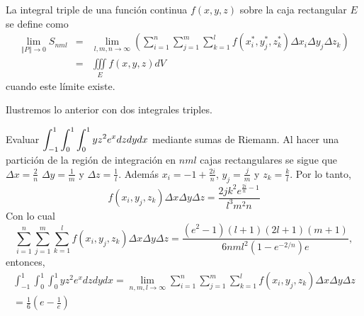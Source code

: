 \begin{defi}
La integral triple de una función continua $f(x,y,z)$
sobre la caja rectangular $E$ se define como
\begin{eqnarray}
\lim_{\left\Vert P\right\Vert \rightarrow 0}S_{nml} &=& \lim_{l,m,n \to\infty}\left(\sum_{i=1}^{n}\sum_{j=1}^{m}\sum_{k=1}^{l}f\left( x_{i}^{\ast },y_{j}^{\ast },z_{k}^{\ast}\right) \Delta x_{i}\Delta y_{j}\Delta z_{k} \right)\nonumber \\ &=&\iiint\limits_{E}f\left(x,y,z\right) dV
\end{eqnarray}
cuando este límite existe.
\end{defi}
Ilustremos lo anterior con dos integrales triples.
\begin{ejemplo}
Evaluar {\small $\displaystyle \int_{-1}^1\int_0^1\int_0^1  yz^2 e^{x} dzdydx$} mediante sumas de Riemann.
Al hacer una partición de la región de integración en $nml$ cajas rectangulares se sigue que
$\Delta x= \frac{2}{n}$ $\Delta y= \frac{1}{m}$ y $\Delta z= \frac{1}{l}$. Además
$x_i= -1+\frac{2i}{n}$, $y_j=\frac{j}{m}$ y $z_k=\frac{k}{l}$.
Por lo tanto,
$$f(x_i,y_j,z_k)\Delta x \Delta y\Delta z=\frac{2 j k^2 e^{\frac{2 i}{n}-1}}{l^3 m^2 n}$$
Con lo cual
$$\sum_{i=1}^n\sum_{j=1}^m\sum_{k=1}^l f(x_i,y_j,z_k)\Delta x \Delta y\Delta z=\frac{\left(e^2-1\right) (l+1)(2l+1)(m+1)}{6nml^2 \left(1-e^{-2/n}\right)e},$$ entonces,
\begin{multline*} \int_{-1}^1\int_0^1\int_0^1  yz^2 e^{x} dzdydx= \lim_{n,m,l \to \infty}\sum_{i=1}^n\sum_{j=1}^m\sum_{k=1}^l f(x_i,y_j,z_k)\Delta x \Delta y\Delta z \\ =\frac{1}{6} \left(e-\frac{1}{e}\right)
\end{multline*}
\end{ejemplo}

